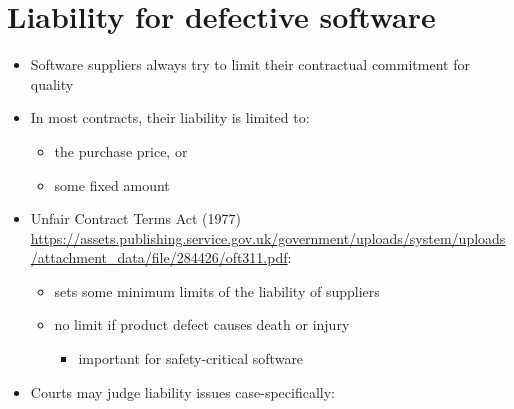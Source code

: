 \documentclass{article}
\begin{document}
\section{Liability for defective software}
\begin{itemize}
\item Software suppliers always try to limit their contractual commitment for quality
\item In most contracts, their liability is limited to:
\begin{itemize}
\item the purchase price, or
\item some fixed amount
\end{itemize}
\item Unfair Contract Terms Act (1977) \url{https://assets.publishing.service.gov.uk/government/uploads/system/uploads/attachment_data/file/284426/oft311.pdf}:
\begin{itemize}
\item sets some minimum limits of the liability of suppliers
\item no limit if product defect causes death or injury
\begin{itemize}
\item important for safety-critical software
\end{itemize}
\end{itemize}
\item Courts may judge liability issues case-specifically:

\end{itemize}
\end{document}
